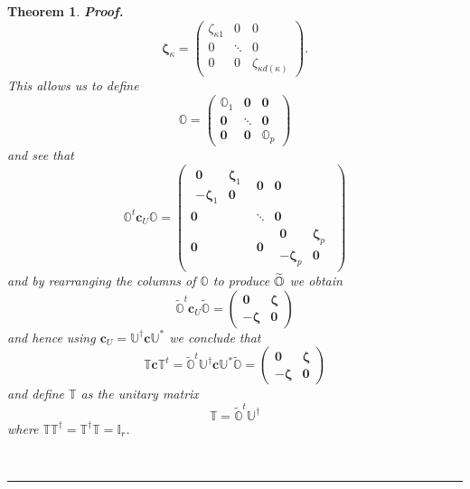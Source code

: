 \documentclass[aps,preprint]{revtex4}
\newtheorem{theorem}{Theorem}
\newenvironment{proof}[1][Proof]{\noindent\textbf{#1.} }{\ \rule{0.5em}{0.5em}}
\begin{document}
\begin{theorem}
\begin{proof}
\begin{equation}
\mathbf{\zeta }_{\kappa }=\left( 
\begin{array}{ccc}
\zeta _{\kappa 1} & 0 & 0 \\ 
0 & \ddots & 0 \\ 
0 & 0 & \zeta _{\kappa d\left( \kappa \right) }%
\end{array}%
\right) .
\end{equation}%
This allows us to define 
\begin{equation}
\mathbb{O=}\left( 
\begin{array}{ccc}
\mathbb{O}_{1} & \mathbf{0} & \mathbf{0} \\ 
\mathbf{0} & \ddots & \mathbf{0} \\ 
\mathbf{0} & \mathbf{0} & \mathbb{O}_{p}%
\end{array}%
\right)
\end{equation}%
and see that 
\begin{equation}
\mathbb{O}^{t}\mathbf{c}_{U}\mathbb{O}=\left( 
\begin{array}{ccc}
\begin{array}{cc}
\mathbf{0} & \mathbf{\zeta }_{1} \\ 
-\mathbf{\zeta }_{1} & \mathbf{0}%
\end{array}
& \mathbf{0} & \mathbf{0} \\ 
\mathbf{0} & \ddots & \mathbf{0} \\ 
\mathbf{0} & \mathbf{0} & 
\begin{array}{cc}
\mathbf{0} & \mathbf{\zeta }_{p} \\ 
-\mathbf{\zeta }_{p} & \mathbf{0}%
\end{array}%
\end{array}%
\right)  \label{cor1}
\end{equation}%
and by rearranging the columns of $\mathbb{O}$ to produce $\widetilde{%
\mathbb{O}}$ we obtain 
\begin{equation}
\widetilde{\mathbb{O}}^{t}\mathbf{c}_{U}\widetilde{\mathbb{O}}=\left( 
\begin{array}{cc}
\mathbf{0} & \mathbf{\zeta } \\ 
-\mathbf{\zeta } & \mathbf{0}%
\end{array}%
\right)
\end{equation}%
and hence using $\mathbf{c}_{U}=\mathbb{U}^{\dagger }\mathbf{c}\mathbb{U}%
^{\ast }$ we conclude that 
\begin{equation}
\mathbb{T}\mathbf{c}\mathbb{T}^{t}=\widetilde{\mathbb{O}}^{t}\mathbb{U}%
^{\dagger }\mathbf{c}\mathbb{U}^{\ast }\widetilde{\mathbb{O}}=\left( 
\begin{array}{cc}
\mathbf{0} & \mathbf{\zeta } \\ 
-\mathbf{\zeta } & \mathbf{0}%
\end{array}%
\right)
\end{equation}%
and define $\mathbb{T}$ as the unitary matrix 
\begin{equation}
\mathbb{T}=\widetilde{\mathbb{O}}^{t}\mathbb{U}^{\dagger }
\end{equation}%
where $\mathbb{TT}^{\dagger }=\mathbb{T^{\dagger }T=I}_{r}$.


\end{proof}
\end{theorem}
\end{document}
